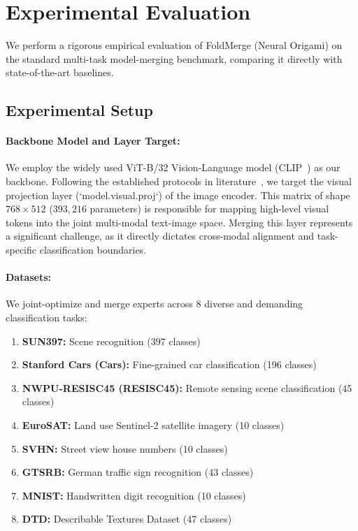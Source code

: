 \section{Experimental Evaluation}
\label{sec:experiments}

We perform a rigorous empirical evaluation of FoldMerge (Neural Origami) on the standard multi-task model-merging benchmark, comparing it directly with state-of-the-art baselines.

\subsection{Experimental Setup}
\paragraph{Backbone Model and Layer Target:}
We employ the widely used ViT-B/32 Vision-Language model (CLIP~\cite{radford2021learning}) as our backbone. 
Following the established protocols in literature~\cite{jung2025symerge}, we target the visual projection layer (`model.visual.proj`) of the image encoder. 
This matrix of shape $768 \times 512$ ($393,216$ parameters) is responsible for mapping high-level visual tokens into the joint multi-modal text-image space. 
Merging this layer represents a significant challenge, as it directly dictates cross-modal alignment and task-specific classification boundaries.

\paragraph{Datasets:}
We joint-optimize and merge experts across $8$ diverse and demanding classification tasks:
\begin{enumerate}
  \item \textbf{SUN397:} Scene recognition (397 classes)
  \item \textbf{Stanford Cars (Cars):} Fine-grained car classification (196 classes)
  \item \textbf{NWPU-RESISC45 (RESISC45):} Remote sensing scene classification (45 classes)
  \item \textbf{EuroSAT:} Land use Sentinel-2 satellite imagery (10 classes)
  \item \textbf{SVHN:} Street view house numbers (10 classes)
  \item \textbf{GTSRB:} German traffic sign recognition (43 classes)
  \item \textbf{MNIST:} Handwritten digit recognition (10 classes)
  \item \textbf{DTD:} Describable Textures Dataset (47 classes)
\end{enumerate}

